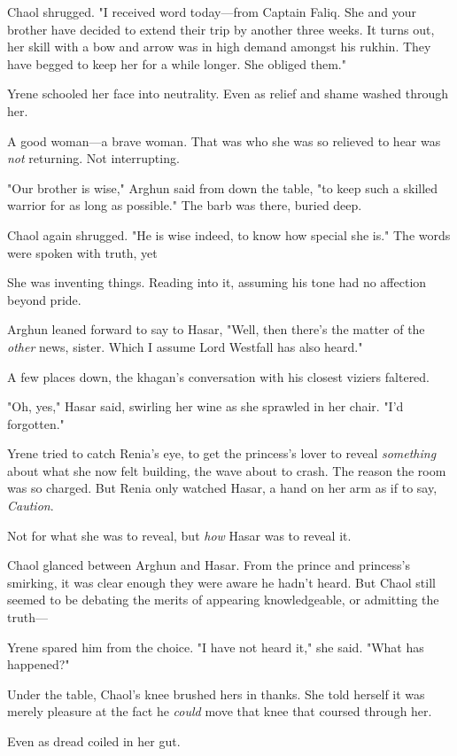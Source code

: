 Chaol shrugged. "I received word today---from Captain Faliq. She and your brother have decided to extend their trip by another three weeks. It turns out, her skill with a bow and arrow was in high demand amongst his rukhin. They have begged to keep her for a while longer. She obliged them."

Yrene schooled her face into neutrality. Even as relief and shame washed through her.

A good woman---a brave woman. That was who she was so relieved to hear was \emph{not} returning. Not  interrupting.

"Our brother is wise," Arghun said from down the table, "to keep such a skilled warrior for as long as possible." The barb was there, buried deep.

Chaol again shrugged. "He is wise indeed, to know how special she is." The words were spoken with truth, yet 

She was inventing things. Reading into it, assuming his tone had no affection beyond pride.

Arghun leaned forward to say to Hasar, "Well, then there's the matter of the \emph{other} news, sister. Which I assume Lord Westfall has also heard."

A few places down, the khagan's conversation with his closest viziers faltered.

"Oh, yes," Hasar said, swirling her wine as she sprawled in her chair. "I'd forgotten."

Yrene tried to catch Renia's eye, to get the princess's lover to reveal
\emph{something} about what she now felt building, the wave about to crash. The reason the room was so charged. But Renia only watched Hasar, a hand on her arm as if to say, \emph{Caution}.

Not for what she was to reveal, but \emph{how} Hasar was to reveal it.

Chaol glanced between Arghun and Hasar. From the prince and princess's smirking, it was clear enough they were aware he hadn't heard. But Chaol still seemed to be debating the merits of appearing knowledgeable, or admitting the truth---

Yrene spared him from the choice. "I have not heard it," she said. "What has happened?"

Under the table, Chaol's knee brushed hers in thanks. She told herself it was merely pleasure at the fact he \emph{could} move that knee that coursed through her.

Even as dread coiled in her gut.

